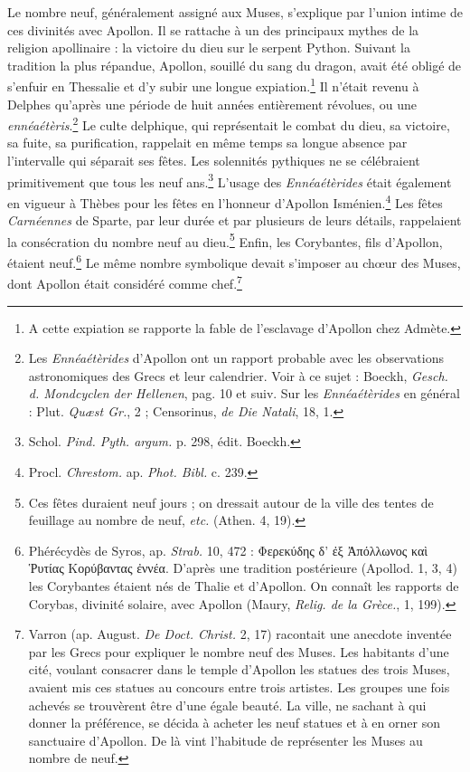 \documentclass[a4paper, 11pt, oneside, polutonikogreek, french]{article}
\begin{document}
Le nombre neuf, généralement assigné aux Muses, s'explique par l'union intime de ces divinités avec Apollon. Il se rattache à un des principaux mythes de la religion apollinaire : la victoire du dieu sur le serpent Python. Suivant la tradition la plus répandue, Apollon, souillé du sang du dragon, avait été obligé de s'enfuir en Thessalie et d'y subir une longue expiation.\footnote{A cette expiation se rapporte la fable de l'esclavage d'Apollon chez Admète.} Il n'était revenu à Delphes qu'après une période de huit années entièrement révolues, ou une \emph{ennéaétèris}.\footnote{Les \emph{Ennéaétèrides} d'Apollon ont un rapport probable avec les observations astronomiques des Grecs et leur calendrier. Voir à ce sujet : Boeckh, \emph{Gesch. d. Mondcyclen der Hellenen}, pag. 10 et suiv. Sur les \emph{Ennéaétèrides} en général : Plut. \emph{Quæst Gr.}, 2 ; Censorinus, \emph{de Die Natali}, 18, 1.} Le culte delphique, qui représentait le combat du dieu, sa victoire, sa fuite, sa purification, rappelait en même temps sa longue absence par l'intervalle qui séparait ses fêtes. Les solennités pythiques ne se célébraient primitivement que tous les neuf ans.\footnote{Schol. \emph{Pind. Pyth. argum.} p. 298, édit. Boeckh.} L'usage des \emph{Ennéaétèrides} était également en vigueur à Thèbes pour les fêtes en l'honneur d'Apollon Isménien.\footnote{Procl. \emph{Chrestom.} ap. \emph{Phot. Bibl.} c. 239.} Les fêtes \emph{Carnéennes} de Sparte, par leur durée et par plusieurs de leurs détails, rappelaient la consécration du nombre neuf au dieu.\footnote{Ces fêtes duraient neuf jours ; on dressait autour de la ville des tentes de feuillage au nombre de neuf, \emph{etc.} (Athen. 4, 19).} Enfin, les Corybantes, fils d'Apollon, étaient neuf.\footnote{Phérécydès de Syros, ap. \emph{Strab.} 10, 472 : Φερεκύδης δ' ἐξ Ἀπόλλωνος καὶ Ῥυτίας Κορύβαντας ἐννέα. D'après une tradition postérieure (Apollod. 1, 3, 4) les Corybantes étaient nés de Thalie et d'Apollon. On connaît les rapports de Corybas, divinité solaire, avec Apollon (Maury, \emph{Relig. de la Grèce.}, 1, 199).} Le même nombre symbolique devait s'imposer au chœur des Muses, dont Apollon était considéré comme chef.\footnote{Varron (ap. August. \emph{De Doct. Christ.} 2, 17) racontait une anecdote inventée par les Grecs pour expliquer le nombre neuf des Muses. Les habitants d'une cité, voulant consacrer dans le temple d'Apollon les statues des trois Muses, avaient mis ces statues au concours entre trois artistes. Les groupes une fois achevés se trouvèrent être d'une égale beauté. La ville, ne sachant à qui donner la préférence, se décida à acheter les neuf statues et à en orner son sanctuaire d'Apollon. De là vint l'habitude de représenter les Muses au nombre de neuf.}
\end{document}
